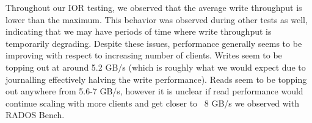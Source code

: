 Throughout our IOR testing, we observed that the average write throughput is
lower than the maximum.  This behavior was observed during other tests as well,
indicating that we may have periods of time where write throughput is
temporarily degrading.  Despite these issues, performance generally seems to be
improving with respect to increasing number of clients.  Writes seem to be
topping out at around 5.2 GB/s (which is roughly what we would expect due to
journalling effectively halving the write performance).  Reads seem to be
topping out anywhere from 5.6-7 GB/s, however it is unclear if read performance
would continue scaling with more clients and get closer to ~8 GB/s we observed 
with RADOS Bench.

\begin{comment}
\subsection{Metadata Performance Tuning}
For brevity's sake, we are omitting most of our file and directory creation
rate results.  However, over the course of our testing we did notice that in
CephFS 0.64 a significant improvement in the performance of file creation with
mdtest.  Shown in Figure~\ref{fig:mdtest-064-file-create}, we note
that as number of clients increase, the file creation rate does not scale
linearly, which suggested some form of lock contention.  Due to the large
differences in the initially observed performance, and the performance with
Ceph 0.64, opportunities for file and directory create tuning may be
substantial. 

\begin{figure}[htb]
\centering
\texttt{[image: mdtest-064-file-create]}
\caption{mdtest of file creation on Ceph 0.64}
\label{fig:mdtest-064-file-create}
\end{figure}

\end{comment}
